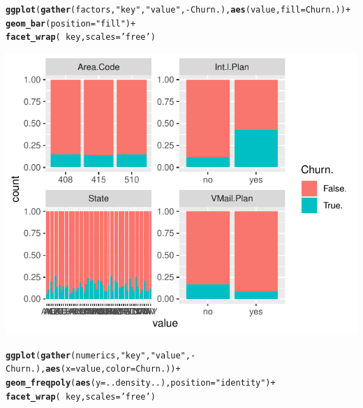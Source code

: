 \documentclass{article}\usepackage[]{graphicx}\usepackage[]{color}
\makeatletter
\def\maxwidth{ %
  \ifdim\Gin@nat@width>\linewidth
    \linewidth
  \else
    \Gin@nat@width
  \fi
}
\newcommand{\hlstr}[1]{\textcolor[rgb]{0.192,0.494,0.8}{#1}}%
\newcommand{\hlopt}[1]{\textcolor[rgb]{0,0,0}{#1}}%
\newcommand{\hlstd}[1]{\textcolor[rgb]{0.345,0.345,0.345}{#1}}%
\newcommand{\hlkwc}[1]{\textcolor[rgb]{0.333,0.667,0.333}{#1}}%
\newcommand{\hlkwd}[1]{\textcolor[rgb]{0.737,0.353,0.396}{\textbf{#1}}}%
\newenvironment{kframe}{%
 \def\at@end@of@kframe{}%
 \ifinner\ifhmode%
  \def\at@end@of@kframe{\end{minipage}}%
  \begin{minipage}{\columnwidth}%
 \fi\fi%
 \def\FrameCommand##1{\hskip\@totalleftmargin \hskip-\fboxsep
 \colorbox{shadecolor}{##1}\hskip-\fboxsep
     \hskip-\linewidth \hskip-\@totalleftmargin \hskip\columnwidth}%
 \MakeFramed {\advance\hsize-\width
   \@totalleftmargin\z@ \linewidth\hsize
   \@setminipage}}%
 {\par\unskip\endMakeFramed%
 \at@end@of@kframe}
\newenvironment{knitrout}{}{} %
\makeatother
\begin{document}
\begin{knitrout}
\color{fgcolor}\begin{kframe}
\begin{alltt}
\hlkwd{ggplot}\hlstd{(}\hlkwd{gather}\hlstd{(factors,} \hlstr{"key"}\hlstd{,} \hlstr{"value"}\hlstd{,} \hlopt{-}\hlstd{Churn.),} \hlkwd{aes}\hlstd{(value,} \hlkwc{fill}\hlstd{=Churn.))} \hlopt{+}
  \hlkwd{geom_bar}\hlstd{(}\hlkwc{position}\hlstd{=}\hlstr{"fill"}\hlstd{)} \hlopt{+}
  \hlkwd{facet_wrap}\hlstd{(}\hlopt{~}\hlstd{key,} \hlkwc{scales}\hlstd{=}\hlstr{'free'}\hlstd{)}
\end{alltt}
\end{kframe}

{\centering \includegraphics[width=\maxwidth]{figure/Overviews_plots_grouped-1} 

}


\begin{kframe}\begin{alltt}
\hlkwd{ggplot}\hlstd{(}\hlkwd{gather}\hlstd{(numerics,} \hlstr{"key"}\hlstd{,} \hlstr{"value"}\hlstd{,} \hlopt{-}\hlstd{Churn.),} \hlkwd{aes}\hlstd{(}\hlkwc{x}\hlstd{=value,} \hlkwc{color}\hlstd{=Churn.))} \hlopt{+}
  \hlkwd{geom_freqpoly}\hlstd{(}\hlkwd{aes}\hlstd{(}\hlkwc{y}\hlstd{=..density..),} \hlkwc{position}\hlstd{=}\hlstr{"identity"}\hlstd{)} \hlopt{+}
  \hlkwd{facet_wrap}\hlstd{(}\hlopt{~}\hlstd{key,} \hlkwc{scales}\hlstd{=}\hlstr{'free'}\hlstd{)}
\end{alltt}
\end{kframe}


\end{knitrout}
\end{document}
